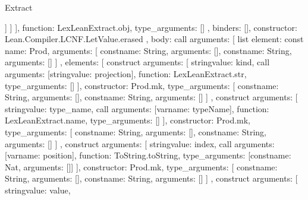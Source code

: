 \begin{lexlean}{Extract}
\begin{toolingmodule}
{{{{{{{                      ]
                    }
                  ]
                }
              ],
              function: LexLeanExtract.obj,
              type_arguments: []
            },
            binders: [],
            constructor: Lean.Compiler.LCNF.LetValue.erased
          },
          {
            body: call{
              arguments: [
                list{
                  element: const{
                    name: Prod,
                    arguments: [
                      const{name: String, arguments: []},
                      const{name: String, arguments: []}
                    ]
                  },
                  elements: [
                    construct{
                      arguments: [
                        string{value: kind},
                        call{
                          arguments: [string{value: projection}],
                          function: LexLeanExtract.str,
                          type_arguments: []
                        }
                      ],
                      constructor: Prod.mk,
                      type_arguments: [
                        const{name: String, arguments: []},
                        const{name: String, arguments: []}
                      ]
                    },
                    construct{
                      arguments: [
                        string{value: type_name},
                        call{
                          arguments: [var{name: typeName}],
                          function: LexLeanExtract.name,
                          type_arguments: []
                        }
                      ],
                      constructor: Prod.mk,
                      type_arguments: [
                        const{name: String, arguments: []},
                        const{name: String, arguments: []}
                      ]
                    },
                    construct{
                      arguments: [
                        string{value: index},
                        call{
                          arguments: [var{name: position}],
                          function: ToString.toString,
                          type_arguments: [const{name: Nat, arguments: []}]
                        }
                      ],
                      constructor: Prod.mk,
                      type_arguments: [
                        const{name: String, arguments: []},
                        const{name: String, arguments: []}
                      ]
                    },
                    construct{
                      arguments: [
                        string{value: value},
}}}}}}}
\end{toolingmodule}
\end{lexlean}
